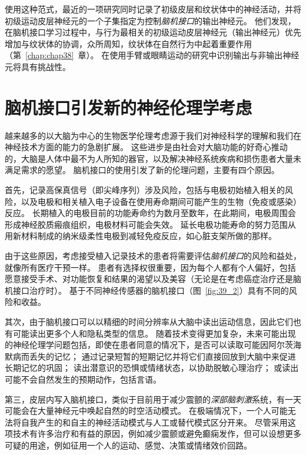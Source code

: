 使用这种范式，最近的一项研究同时记录了初级皮层和纹状体中的神经活动，并将初级运动皮层神经元的一个子集指定为控制\textit{脑机接口}的输出神经元。
他们发现，在脑机接口学习过程中，与行为最相关的初级运动皮层神经元（输出神经元）优先增加与纹状体的协调，众所周知，纹状体在自然行为中起着重要作用（第~\ref{chap:chap38}~章）。
在使用手臂或眼睛运动的研究中识别输出与非输出神经元将具有挑战性。



\section{脑机接口引发新的神经伦理学考虑}

越来越多的以大脑为中心的生物医学伦理考虑源于我们对神经科学的理解和我们在神经技术方面的能力的急剧扩展。
这些进步是由社会对大脑功能的好奇心推动的，大脑是人体中最不为人所知的器官，以及解决神经系统疾病和损伤患者大量未满足需求的愿望。
脑机接口的使用引发了新的伦理问题，主要有四个原因。


首先，记录高保真信号（即尖峰序列）涉及风险，包括与电极初始植入相关的风险，以及电极和相关植入电子设备在使用寿命期间可能产生的生物（免疫或感染）反应。
长期植入的电极目前的功能寿命约为数月至数年，在此期间，电极周围会形成神经胶质瘢痕组织，电极材料可能会失效。
延长电极功能寿命的努力范围从用新材料制成的纳米级柔性电极到减轻免疫反应，如心脏支架所做的那样。


由于这些原因，考虑接受植入记录技术的患者将需要评估\textit{脑机接口}的风险和益处，就像所有医疗干预一样。
患者有选择权很重要，因为每个人都有个人偏好，包括愿意接受手术、对功能恢复和结果的渴望以及美容（无论是在考虑癌症治疗还是脑机接口治疗时）。
基于不同神经传感器的脑机接口（图~\ref{fig:39_2}）具有不同的风险和收益。


其次，由于脑机接口可以以精细的时间分辨率从大脑中读出运动信息，因此它们也有可能读出更多个人和隐私类型的信息。
随着技术变得更加复杂，未来可能出现的神经伦理学问题包括，即使在患者同意的情况下，是否可以读取可能因阿尔茨海默病而丢失的记忆；
通过记录短暂的短期记忆并将它们直接回放到大脑中来促进长期记忆的巩固；
读出潜意识的恐惧或情绪状态，以协助脱敏心理治疗；
或读出可能不会自然发生的预期动作，包括言语。


第三，皮层内写入脑机接口，类似于目前用于减少震颤的\textit{深部脑刺激}系统，有一天可能会在大量神经元中唤起自然的时空活动模式。
在极端情况下，一个人可能无法将自我产生的和自主的神经活动模式与人工或替代模式区分开来。
尽管采用这项技术有许多治疗和有益的原因，例如减少震颤或避免癫痫发作，但可以设想更多可疑的用途，例如征用一个人的运动、感觉、决策或情绪效价回路。



